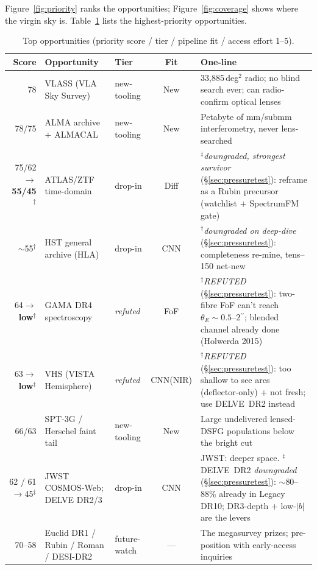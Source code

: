 \documentclass[11pt,letterpaper]{article}
\providecommand{\arcsec}{\ensuremath{^{\prime\prime}}}
\begin{document}
Figure~\ref{fig:priority} ranks the opportunities; Figure~\ref{fig:coverage} shows where the
virgin sky is. Table~\ref{tab:top} lists the highest-priority opportunities.

\begin{table}[t]
\centering\footnotesize
\caption{Top opportunities (priority score / tier / pipeline fit / access effort 1--5).}
\label{tab:top}
\begin{tabular}{@{}rllcl@{}}
\toprule
Score & Opportunity & Tier & Fit & One-line \\
\midrule
78 & VLASS (VLA Sky Survey) & new-tooling & New & 33{,}885\,deg$^2$ radio; no blind search ever; can radio-confirm optical lenses \\
78/75 & ALMA archive $+$ ALMACAL & new-tooling & New & Petabyte of mm/submm interferometry, never lens-searched \\
75/62$\to$\textbf{55/45}$^\ddagger$ & ATLAS/ZTF time-domain & drop-in & Diff & $^\ddagger$\emph{downgraded, strongest survivor} (\S\ref{sec:pressuretest}): reframe as a Rubin precursor (watchlist $+$ SpectrumFM gate) \\
$\sim$55$^\dagger$ & HST general archive (HLA) & drop-in & CNN & $^\dagger$\emph{downgraded on deep-dive} (\S\ref{sec:pressuretest}): completeness re-mine, tens--150 net-new \\
64$\to$\textbf{low}$^\ddagger$ & GAMA DR4 spectroscopy & \emph{refuted} & FoF & $^\ddagger$\emph{REFUTED} (\S\ref{sec:pressuretest}): two-fibre FoF can't reach $\theta_E\sim0.5$--$2\arcsec$; blended channel already done (Holwerda 2015) \\
63$\to$\textbf{low}$^\ddagger$ & VHS (VISTA Hemisphere) & \emph{refuted} & CNN(NIR) & $^\ddagger$\emph{REFUTED} (\S\ref{sec:pressuretest}): too shallow to see arcs (deflector-only) + not fresh; use DELVE~DR2 instead \\
66/63 & SPT-3G / Herschel faint tail & new-tooling & New & Large undelivered lensed-DSFG populations below the bright cut \\
62 / 61$\to$45$^\ddagger$ & JWST COSMOS-Web; DELVE DR2/3 & drop-in & CNN & JWST: deeper space. $^\ddagger$DELVE~DR2 \emph{downgraded} (\S\ref{sec:pressuretest}): $\sim$80--88\% already in Legacy DR10; DR3-depth $+$ low-$|b|$ are the levers \\
70--58 & Euclid DR1 / Rubin / Roman / DESI-DR2 & future-watch & --- & The megasurvey prizes; pre-position with early-access inquiries \\
\bottomrule
\end{tabular}
\end{table}
\end{document}
